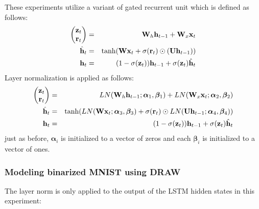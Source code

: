 \documentclass{article}
\begin{document}
These experiments utilize a variant of gated recurrent unit which is defined as follows:
%
\begin{eqnarray}
\begin{pmatrix}{\bf z}_t\\{\bf r}_t\end{pmatrix} &=& {\bf W}_h {\bf h}_{t-1} + {\bf W}_x {\bf x}_t \\
\hat{{\bf h}}_t &=& \text{tanh}({\bf W} {\bf x}_t + \sigma({\bf r}_t) \odot ({\bf U} {\bf h}_{t-1})) \\
{\bf h}_t &=& (1 - \sigma({\bf z}_t)) {\bf h}_{t-1} + \sigma({\bf z}_t) \hat{{\bf h}}_t
\end{eqnarray}
%
Layer normalization is applied as follows:
%
\begin{eqnarray}
\begin{pmatrix}{\bf z}_t\\{\bf r}_t\end{pmatrix} &=& LN({\bf W}_h {\bf h}_{t-1}; \bm{\alpha}_1, \bm{\beta}_1) + LN({\bf W}_x {\bf x}_t; \bm{\alpha}_2, \bm{\beta}_2) \\
\hat{{\bf h}}_t &=& \text{tanh}(LN({\bf W} {\bf x}_t; \bm{\alpha}_3, \bm{\beta}_3) + \sigma({\bf r}_t) \odot LN({\bf U} {\bf h}_{t-1}; \bm{\alpha}_4, \bm{\beta}_4)) \\
{\bf h}_t &=& (1 - \sigma({\bf z}_t)) {\bf h}_{t-1} + \sigma({\bf z}_t) \hat{{\bf h}}_t
\end{eqnarray}
%
just as before, $\bm{\alpha}_i$ is initialized to a vector of zeros and each $\bm{\beta}_i$ is initialized to a vector of ones.

\subsubsection*{Modeling binarized MNIST using DRAW}

The layer norm is only applied to the output of the LSTM hidden states in this experiment:
\end{document}
